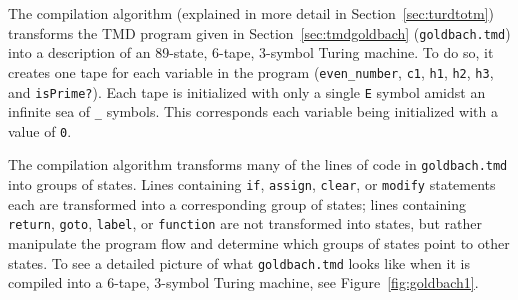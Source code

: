 \documentclass[11pt]{report}
\begin{document}
The compilation algorithm (explained in more detail in Section~\ref{sec:turdtotm}) transforms the TMD program given in Section~\ref{sec:tmdgoldbach} (\texttt{goldbach.tmd}) into a description of an 89-state, 6-tape, 3-symbol Turing machine. To do so, it creates one tape for each variable in the program (\texttt{even\_number}, \texttt{c1}, \texttt{h1}, \texttt{h2}, \texttt{h3}, and \texttt{isPrime?}). Each tape is initialized with only a single \texttt{E} symbol amidst an infinite sea of \texttt{\_} symbols. This corresponds each variable being initialized with a value of \texttt{0}.

The compilation algorithm transforms many of the lines of code in \texttt{goldbach.tmd} into groups of states. Lines containing \texttt{if}, \texttt{assign}, \texttt{clear}, or \texttt{modify} statements each are transformed into a corresponding group of states; lines containing \texttt{return}, \texttt{goto}, \texttt{label}, or \texttt{function} are not transformed into states, but rather manipulate the program flow and determine which groups of states point to other states. To see a detailed picture of what \texttt{goldbach.tmd} looks like when it is compiled into a 6-tape, 3-symbol Turing machine, see Figure~\ref{fig:goldbach1}.
\end{document}
